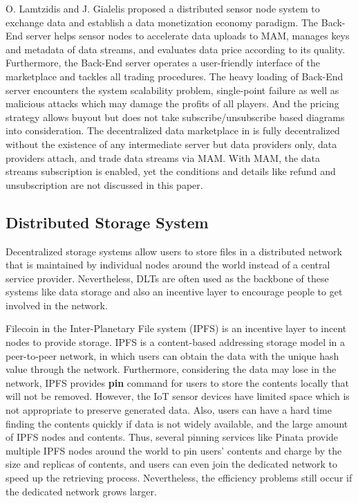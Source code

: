 \documentclass[conference]{IEEEtran}
\begin{document}
O. Lamtzidis and J. Gialelis \cite{IOTASensorNode} proposed a distributed sensor node system to exchange data and establish a data monetization economy paradigm. The Back-End server helps sensor nodes to accelerate data uploads to MAM, manages keys and metadata of data streams, and evaluates data price according to its quality. Furthermore, the Back-End server operates a user-friendly interface of the marketplace and tackles all trading procedures. The heavy loading of Back-End server encounters the system scalability problem, single-point failure as well as malicious attacks which may damage the profits of all players. And the pricing strategy allows buyout but does not take subscribe/unsubscribe based diagrams into consideration. The decentralized data marketplace in \cite{DDMSmartCities} is fully decentralized without the existence of any intermediate server but data providers only, data providers attach, and trade data streams via MAM. With MAM, the data streams subscription is enabled, yet the conditions and details like refund and unsubscription are not discussed in this paper.
 
\subsection{Distributed Storage System}
\label{section:distributed_storage}
Decentralized storage systems allow users to store files in a distributed network that is maintained by individual nodes around the world instead of a central service provider. Nevertheless, DLTs are often used as the backbone of these systems like data storage and also an incentive layer to encourage people to get involved in the network.

Filecoin \cite{FileCoin} in the Inter-Planetary File system (IPFS) is an incentive layer to incent nodes to provide storage. IPFS is a content-based addressing storage model in a peer-to-peer network, in which users can obtain the data with the unique hash value through the network. Furthermore, considering the data may lose in the network, IPFS provides \textbf{pin} command for users to store the contents locally that will not be removed. However, the IoT sensor devices have limited space which is not appropriate to preserve generated data. Also, users can have a hard time finding the contents quickly if data is not widely available, and the large amount of IPFS nodes and contents. Thus, several pinning services like Pinata provide multiple IPFS nodes around the world to pin users' contents and charge by the size and replicas of contents, and users can even join the dedicated network to speed up the retrieving process. Nevertheless, the efficiency problems still occur if the dedicated network grows larger.
\end{document}
